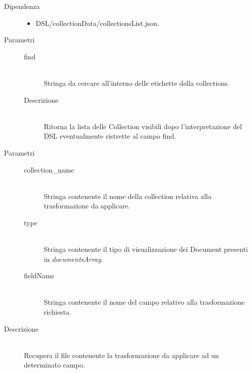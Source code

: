 \begin{description}
\begin{mldescription}
	 \hfill 
		\begin{description}
			\item[Dipendenza] \hfill
				\begin{itemize}
					\item DSL/collectionData/collectionsList.json.
				\end{itemize}
			\item[Parametri] \hfill
							\begin{description}
								\item[find] \hfill \\
									Stringa da cercare all'interno delle etichette della collections.
			\item[Descrizione] \hfill \\
			Ritorna la lista delle Collection visibili dopo l'interpretazione del DSL eventualmente ristrette al campo find. 
		\end{description}
		\end{description}
	   	\begin{description}
	   		\item[Parametri] \hfill
	   					\begin{description}
	   						\item[collection\_name] \hfill \\
	   						Stringa contenente il nome della collection relativa alla trasformazione da applicare.
	   						\item[type] \hfill \\
	   						Stringa contenente il tipo di visualizzazione dei Document presenti in \textit{documentsArray}.
	   						\item[fieldName] \hfill \\
	   						Stringa contenente il nome del campo relativo alla trasformazione richiesta.
	   					\end{description}
	   	 \item[Descrizione] \hfill \\
	   	 Recupera il file contenente la trasformazione da applicare ad un determinato campo.
	   	\end{description}
		

\end{mldescription}
\end{description}
